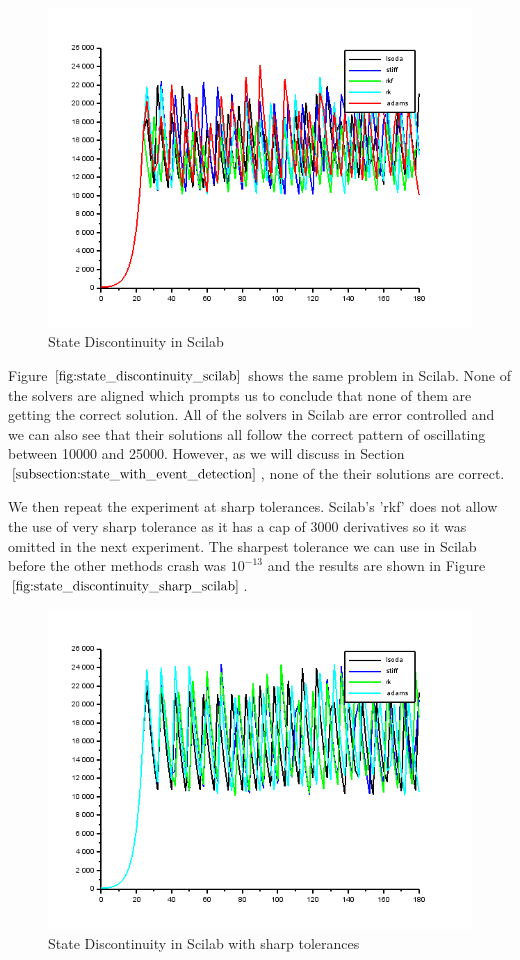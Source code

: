 \begin{figure}[h]
	\centering
	\includegraphics[width=0.7\linewidth]{./figures/state_discontinuity_scilab}
	\caption{State Discontinuity in Scilab}
	\label{fig:state_discontinuity_scilab}
\end{figure}
Figure $\ref{fig:state_discontinuity_scilab}$ shows the same problem in Scilab. None of the solvers are aligned which prompts us to conclude that none of them are getting the correct solution. All of the solvers in Scilab are error controlled and we can also see that their solutions all follow the correct pattern of oscillating between 10000 and 25000.  However, as we will discuss in Section $\ref{subsection:state_with_event_detection}$, none of the their solutions are correct.

We then repeat the experiment at sharp tolerances. Scilab's 'rkf' does not allow the use of very sharp tolerance as it has a cap of 3000 derivatives so it was omitted in the next experiment. The sharpest tolerance we can use in Scilab before the other methods crash was $10^{-13}$ and the results are shown in Figure $\ref{fig:state_discontinuity_sharp_scilab}$.

\begin{figure}[h]
	\centering
	\includegraphics[width=0.7\linewidth]{./figures/state_discontinuity_sharp_sci}
	\caption{State Discontinuity in Scilab with sharp tolerances}
	\label{fig:state_discontinuity_sharp_scilab}
\end{figure}

